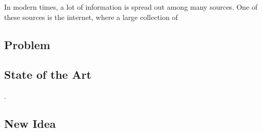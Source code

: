 In modern times, a lot of information is spread out among many sources.
One of these sources is the internet, where a large collection of 
\subsection{Problem}
\subsection{State of the Art}
\cite{intframe}.
\subsection{New Idea}
